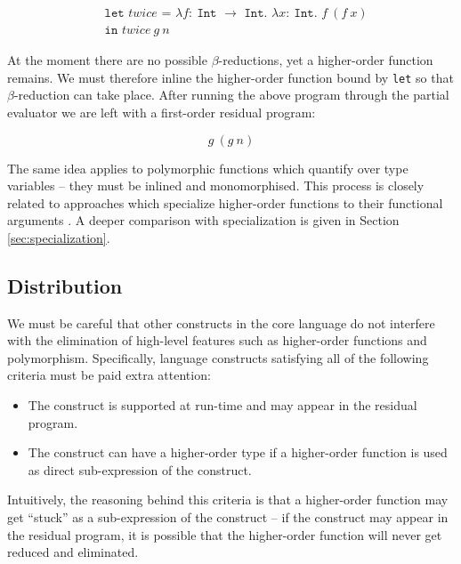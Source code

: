 \documentclass[runningheads]{llncs}
\begin{document}
\begin{equation*}
  \begin{split}
    &\texttt{let $twice$ = $\lambda f :\ $Int $\rightarrow$ Int. $\lambda x :\ $Int. $f\ (f\ x)$} \\
    &\texttt{in $twice\ g\ n$}
  \end{split}
\end{equation*}

At the moment there are no possible $\beta$-reductions, yet a higher-order function remains. We must therefore inline the higher-order function bound by \texttt{let} so that $\beta$-reduction can take place. After running the above program through the partial evaluator we are left with a first-order residual program:

\begin{equation*}
  g\ (g\ n)
\end{equation*}

The same idea applies to polymorphic functions which quantify over type variables -- they must be inlined and monomorphised. This process is closely related to approaches which specialize higher-order functions to their functional arguments \cite{chin1996higher}. A deeper comparison with specialization is given in Section \ref{sec:specialization}.

\subsection{Distribution} \label{sec:distribution}

We must be careful that other constructs in the core language do not interfere with the elimination of high-level features such as higher-order functions and polymorphism. Specifically, language constructs satisfying all of the following criteria must be paid extra attention:

\begin{itemize}
  \item The construct is supported at run-time and may appear in the residual program.
  \item The construct can have a higher-order type if a higher-order function is used as direct sub-expression of the construct.
\end{itemize}

Intuitively, the reasoning behind this criteria is that a higher-order function may get ``stuck'' as a sub-expression of the construct -- if the construct may appear in the residual program, it is possible that the higher-order function will never get reduced and eliminated.
\end{document}
